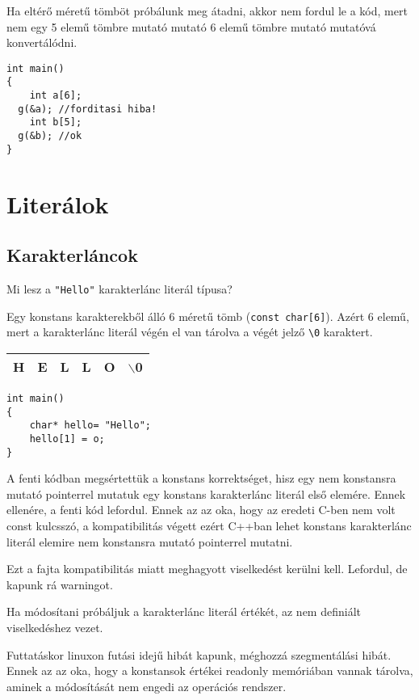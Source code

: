 \documentclass[a4paper,11.5pt,table]{article}
\begin{document}
	Ha eltérő méretű tömböt próbálunk meg átadni, akkor nem fordul le a kód, mert nem egy 5 elemű tömbre mutató mutató 6 elemű tömbre mutató mutatóvá konvertálódni.
	\begin{lstlisting}
int main()
{
	int a[6];
  g(&a); //forditasi hiba!
	int b[5];
  g(&b); //ok
}
	\end{lstlisting}
	
	\section{Literálok}
	\subsection{Karakterláncok}
	Mi lesz a \texttt{"Hello"} karakterlánc literál típusa?
	\smallskip
	
	Egy konstans karakterekből álló 6 méretű tömb (\texttt{const char[6]}). Azért 6 elemű, mert a karakterlánc literál végén el van tárolva a végét jelző \texttt{\textbackslash 0} karaktert.
	
	\begin{center}
		\setlength{\extrarowheight}{2pt}
		\begin{tabular}{|c|c|c|c|c|c|}
			\hline
			H&E&L&L&O&$\backslash$0\\
			\hline
		\end{tabular}
	\end{center}
	\begin{lstlisting}
int main()
{
	char* hello= "Hello";
	hello[1] = o;
}
	\end{lstlisting}
	A fenti kódban megsértettük a konstans korrektséget, hisz egy nem konstansra mutató pointerrel mutatuk egy konstans karakterlánc literál első elemére. Ennek ellenére, a fenti kód lefordul. Ennek az az oka, hogy az eredeti C-ben nem volt const kulcsszó, a kompatibilitás végett ezért C++ban lehet konstans karakterlánc literál elemire nem konstansra mutató pointerrel mutatni.
	\begin{note}
		Ezt a fajta kompatibilitás miatt meghagyott viselkedést kerülni kell. Lefordul, de kapunk rá warningot.
	\end{note}
	Ha módosítani próbáljuk a karakterlánc literál értékét, az nem definiált viselkedéshez vezet. 
	
	Futtatáskor linuxon futási idejű hibát kapunk, méghozzá szegmentálási hibát. Ennek az az oka, hogy a konstansok értékei readonly memóriában vannak tárolva, aminek a módosítását nem engedi az operációs rendszer.
  \medskip
	
\end{document}
